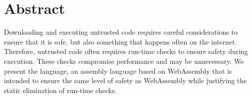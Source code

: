 \chapter{Abstract}
Downloading and executing untrusted code requires careful considerations to ensure that it is safe, but also something that happens often on the internet.
Therefore, untrusted code often requires run-time checks to ensure safety during execution.
These checks compromise performance and may be unnecessary.
We present the \name language, an assembly language based on WebAssembly that is intended to ensure the same level of safety as WebAssembly while justifying the static elimination of run-time checks.